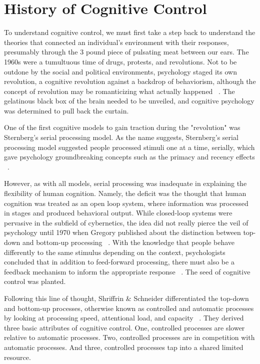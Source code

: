 \documentclass[phd,appendix,figures]{uithesis}
\begin{document}
\section{History of Cognitive Control}

To understand cognitive control, we must first take a step back to understand the theories that connected an individual's environment with their responses, presumably through the 3 pound piece of pulsating meat between our ears.
The 1960s were a tumultuous time of drugs, protests, and revolutions. 
Not to be outdone by the social and political environments, psychology staged its own revolution, a cognitive revolution against a backdrop of behaviorism, although the concept of revolution may be romanticizing what actually happened ~\citep{Leahey1992}. 
The gelatinous black box of the brain needed to be unveiled, and cognitive psychology was determined to pull back the curtain. 

One of the first cognitive models to gain traction during the "revolution" was Sternberg's serial processing model.
As the name suggests, Sternberg's serial processing model suggested people processed stimuli one at a time, serially, which gave psychology groundbreaking concepts such as the primacy and recency effects ~\citep{Sternberg1966}.

However, as with all models, serial processing was inadequate in explaining the flexibility of human cognition.
Namely, the deficit was the thought that human cognition was treated as an open loop system, where information was processed in stages and produced behavioral output. 
While closed-loop systems were pervasive in the subfield of cybernetics, the idea did not really pierce the veil of psychology until 1970 when Gregory published about the distinction between top-down and bottom-up processing ~\citep{Gregory1970}.
With the knowledge that people behave differently to the same stimulus depending on the context, psychologists concluded that in addition to feed-forward processing, there must also be a feedback mechanism to inform the appropriate response ~\citep{Gregory1970}.
The seed of cognitive control was planted.

Following this line of thought, Shriffrin \& Schneider differentiated the top-down and bottom-up processes, otherwise known as controlled and automatic processes by looking at processing speed, attentional load, and capacity ~\citep{Shiffrin1977}. 
They derived three basic attributes of cognitive control. One, controlled processes are slower relative to automatic processes. 
Two, controlled processes are in competition with automatic processes. 
And three, controlled processes tap into a shared limited resource.
\end{document}
